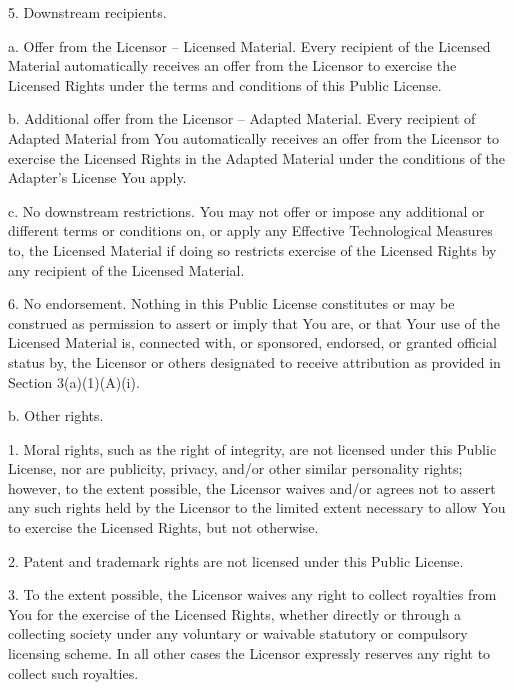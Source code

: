        5. Downstream recipients.

            a. Offer from the Licensor -- Licensed Material. Every
               recipient of the Licensed Material automatically
               receives an offer from the Licensor to exercise the
               Licensed Rights under the terms and conditions of this
               Public License.

            b. Additional offer from the Licensor -- Adapted Material.
               Every recipient of Adapted Material from You
               automatically receives an offer from the Licensor to
               exercise the Licensed Rights in the Adapted Material
               under the conditions of the Adapter's License You apply.

            c. No downstream restrictions. You may not offer or impose
               any additional or different terms or conditions on, or
               apply any Effective Technological Measures to, the
               Licensed Material if doing so restricts exercise of the
               Licensed Rights by any recipient of the Licensed
               Material.

       6. No endorsement. Nothing in this Public License constitutes or
          may be construed as permission to assert or imply that You
          are, or that Your use of the Licensed Material is, connected
          with, or sponsored, endorsed, or granted official status by,
          the Licensor or others designated to receive attribution as
          provided in Section 3(a)(1)(A)(i).

  b. Other rights.

       1. Moral rights, such as the right of integrity, are not
          licensed under this Public License, nor are publicity,
          privacy, and/or other similar personality rights; however, to
          the extent possible, the Licensor waives and/or agrees not to
          assert any such rights held by the Licensor to the limited
          extent necessary to allow You to exercise the Licensed
          Rights, but not otherwise.

       2. Patent and trademark rights are not licensed under this
          Public License.

       3. To the extent possible, the Licensor waives any right to
          collect royalties from You for the exercise of the Licensed
          Rights, whether directly or through a collecting society
          under any voluntary or waivable statutory or compulsory
          licensing scheme. In all other cases the Licensor expressly
          reserves any right to collect such royalties.


